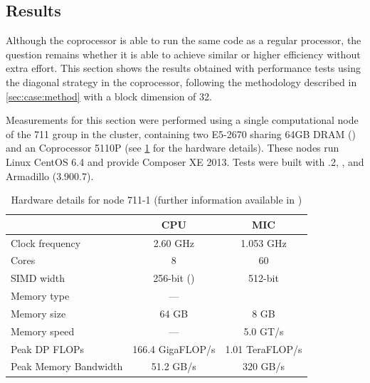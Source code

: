 \documentclass[../thesis]{subfiles}
\begin{document}
	\subsection{Results}
	\label{subsec:mic:native:results}

	Although the \intel\xeonphi coprocessor is able to run the same code as a regular \intel\xeon processor, the question remains whether it is able to achieve similar or higher efficiency without extra effort. This section shows the results obtained with performance tests using the diagonal strategy in the coprocessor, following the methodology described in \cref{sec:case:method} with a block dimension of 32.

	Measurements for this section were performed using a single computational node of the 711 group in the \search cluster, containing two \intel\xeon E5-2670 \cpus sharing 64GB DRAM (\numa) and an \intel\xeonphi Coprocessor 5110P (see \cref{tab:search:711} for the hardware details). These nodes run Linux CentOS 6.4 and provide \intel Composer XE 2013. Tests were built with .2, \mkl, and Armadillo (3.900.7).

	\begin{table}[!b]
		\centering
		\begin{tabular}{l|c|c}
			\hline
			& \textbf{CPU} & \textbf{MIC}  \\
			\hline
			Clock frequency & 2.60 GHz & 1.053 GHz  \\
			Cores & 8 & 60  \\
			SIMD width & 256-bit (\avx) & 512-bit  \\
			Memory type & --- & \gddr5  \\
			Memory size & 64 GB & 8 GB  \\
			Memory speed & --- & 5.0 GT/s  \\
			\hline
			Peak DP FLOPs & 166.4 GigaFLOP/s & 1.01 TeraFLOP/s  \\
			Peak Memory Bandwidth & 51.2 GB/s & 320 GB/s  \\ 
			\hline
		\end{tabular}
		\caption[Hardware details for \search node 711-1]{Hardware details for \search node 711-1 (further information available in \cite{Intel:Xeon:e5_2670,Intel:Xeon:e5_2600,Intel:XeonPhi:5110P})}
		\label{tab:search:711}
	\end{table}
\end{document}
